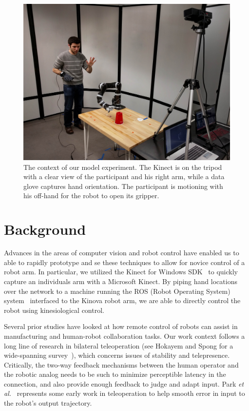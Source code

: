 \documentclass{sigchi}
\begin{document}
\begin{figure}[t]
	\centering
	\includegraphics[width=\columnwidth]{../Data/Figures/kinesiological_demo_2.jpg}
	\caption{The context of our model experiment.  The Kinect is on the tripod with a clear view of the participant and his right arm, while a data glove captures hand orientation.  The participant is motioning with his off-hand for the robot to open its gripper.}
	 \label{fig:demo}
\end{figure} 

\section{Background}

Advances in the areas of computer vision and robot control have enabled us to able to rapidly prototype and se these techniques to allow for novice control of a robot arm.  In particular, we utilized the Kinect for Windows SDK~\cite{Kinect} to quickly capture an individuals arm with a Microsoft Kinect.  By piping hand locations over the network to a machine running the ROS (Robot Operating System) system~\cite{ROS} interfaced to the Kinova robot arm, we are able to directly control the robot using kinesiological control.

Several prior studies have looked at how remote control of robots can assist in manufacturing and human-robot collaboration tasks. Our work context follows a long line of research in bilateral teleoperation (see Hokayem and Spong for a wide-spanning survey~\cite{hokayem2006bilateral}), which concerns issues of stability and telepresence.  Critically, the two-way feedback mechanisms between the human operator and the robotic analog needs to be such to minimize perceptible latency in the connection, and also provide enough feedback to judge and adapt input.  Park \emph{et al.}~\cite{park2003robust} represents some early work in teleoperation to help smooth error in input to the robot's output trajectory.  
\end{document}
